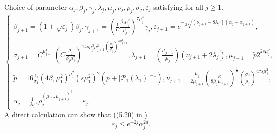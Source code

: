 \documentclass[11pt]{amsart}
\theoremstyle{remark}
\theoremstyle{definition}
\begin{document}
Choice of parameter
 $\alpha_j, \beta_j, \gamma_j, \lambda_j, \mu_j, \nu_j, \rho_j, \sigma_j, \varepsilon_j$ satisfying for all $j \geq 1,$
$$
\left\{\begin{array}{l}
\beta_{j+1}=\left(1+\sqrt{\varepsilon_j}\right) \beta_j,\gamma_{j+1}=\left(\frac{1}{C} \frac{\beta_j \mu_j^2}{\rho_j}\right)^{7 \mu_j^3} \gamma_j,\varepsilon_{j+1}=e^{-\frac{1}{2} \sqrt{(\nu_{j+1}-8 \lambda_j)(\alpha_j-\alpha_{j+1})}}, \\
\sigma_{j+1}=C^{\mu_{j+1}^4}(C \frac{\rho_j}{\beta_j \mu_j^2})^{14 s \mu_j^3 \mu_{j+1}^2(\frac{\sigma_j}{\beta_j})^{s \mu_{j+1}^4}}, \lambda_{j+1}=(\frac{\mu_{j+1}}{\mu_j})(\nu_{j+1}+2 \lambda_j),\mu_{j+1}=\tilde{p} 2^{2 s \mu_j^2},\\
\tilde{p}=16 \frac{\gamma_1}{\sigma_1}(4 \beta_1 \mu_1^2)^{\mu_1^2}(s \mu_1^2)^2(p+|\mathcal{P}_1(\lambda_1)|^{-1}),\nu_{j+1}=\frac{\mu_j}{2 \mu_{j+1}}(\frac{\kappa}{8 \beta_j \mu_{j+1}})^{\frac{1}{\tau}}(\frac{\sigma_j}{\rho_j})^{4 \tau s \mu_j^2}, \\
\alpha_j=\frac{1}{\lambda_j},\rho_j^{\left(\mu_1 \ldots \mu_{j+1}\right)^6}=\varepsilon_j. 
\end{array}\right.
$$
A direct calculation can show that ((5.20) in \cite{E}) \begin{equation}\label{estimate}
    \varepsilon_j\leq e^{-2j}\alpha_j^{2d}.
\end{equation}
\end{document}
